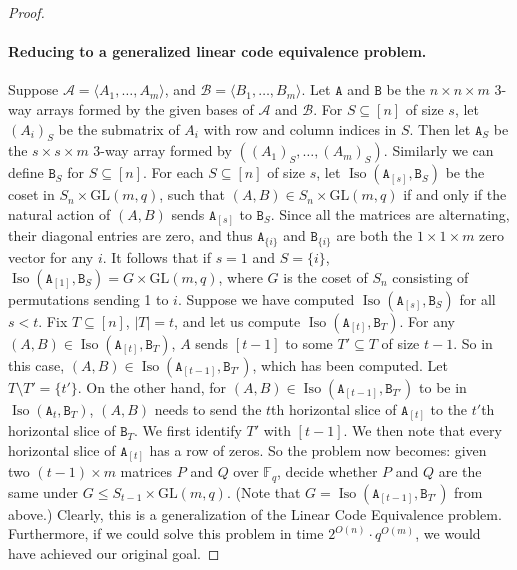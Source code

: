 \begin{proof}
\paragraph{Reducing to a generalized linear code equivalence problem.} Suppose $\mathcal A=\langle A_1,\ldots,A_m\rangle$, and $\mathcal B=\langle B_1,\ldots,B_m\rangle$. Let $\mathtt A$ and $\mathtt B$ be the $n\times n\times m$ 3-way arrays formed by the given bases of $\mathcal A$ and $\mathcal B$. For $S\subseteq[n]$ of size $s$, let $(A_i)_S$ be the submatrix of $A_i$ with row and column indices in $S$. Then let $\mathtt A_S$ be the $s\times s\times m$ 3-way array formed by $((A_1)_S,\ldots,(A_m)_S)$. Similarly we can define $\mathtt B_S$ for $S\subseteq[n]$.
For each $S\subseteq[n]$ of size $s$, let $\operatorname{Iso}(\mathtt A_{[s]},\mathtt B_S)$ be the coset in $S_n\times\mathrm{GL}(m,q)$, such that $(A,B)\in S_n\times\mathrm{GL}(m,q)$ if and only if the natural action of $(A,B)$ sends $\mathtt A_{[s]}$ to $\mathtt B_S$. Since all the matrices are alternating, their diagonal entries are zero, and thus $\mathtt A_{\{i\}}$ and $\mathtt B_{\{i\}}$ are both the $1\times1\times m$ zero vector for any $i$. It follows that if $s=1$ and $S=\{i\}$, $\operatorname{Iso}(\mathtt A_{[1]},\mathtt B_S)=G\times\mathrm{GL}(m,q)$, where $G$ is the coset of $S_n$ consisting of permutations sending 1 to $i$.
Suppose we have computed $\operatorname{Iso}(\mathtt A_{[s]},\mathtt B_S)$ for all $s<t$. Fix $T\subseteq[n]$, $|T|=t$, and let us compute $\operatorname{Iso}(\mathtt A_{[t]},\mathtt B_T)$. For any $(A,B)\in\operatorname{Iso}(\mathtt A_{[t]},\mathtt B_T)$, $A$ sends $[t-1]$ to some $T'\subseteq T$ of size $t-1$. So in this case, $(A,B)\in\operatorname{Iso}(\mathtt A_{[t-1]},\mathtt B_{T'})$, which has been computed. Let $T\setminus T'=\{t'\}$. On the other hand, for $(A,B)\in\operatorname{Iso}(\mathtt A_{[t-1]},\mathtt B_{T'})$ to be in $\operatorname{Iso}(\mathtt A_t,\mathtt B_T)$, $(A,B)$ needs to send the $t$th horizontal slice of $\mathtt A_{[t]}$ to the $t'$th horizontal slice of $\mathtt B_T$.
We first identify $T'$ with $[t-1]$. We then note that every horizontal slice of $\mathtt A_{[t]}$ has a row of zeros. So the problem now becomes: given two $(t-1)\times m$ matrices $P$ and $Q$ over $\mathbb F_q$, decide whether $P$ and $Q$ are the same under $G\le S_{t-1}\times\mathrm{GL}(m,q)$. (Note that $G=\operatorname{Iso}(\mathtt A_{[t-1]},\mathtt B_{T'})$ from above.) Clearly, this is a generalization of the Linear Code Equivalence problem. Furthermore, if we could solve this problem in time $2^{O(n)}\cdot q^{O(m)}$, we would have achieved our original goal.

\end{proof}
